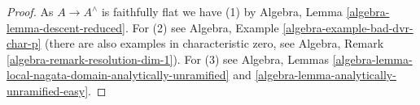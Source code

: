\documentclass[10pt,a4paper]{amsart}
\theoremstyle{plain}
\theoremstyle{definition}
\theoremstyle{remark}
\numberwithin{equation}{subsection}
\begin{document}
\begin{proof}
As $A \to A^\wedge$ is faithfully flat we have (1) by
Algebra, Lemma \ref{algebra-lemma-descent-reduced}.
For (2) see Algebra, Example \ref{algebra-example-bad-dvr-char-p}
(there are also examples in characteristic zero, see
Algebra, Remark \ref{algebra-remark-resolution-dim-1}).
For (3) see Algebra, Lemmas
\ref{algebra-lemma-local-nagata-domain-analytically-unramified} and
\ref{algebra-lemma-analytically-unramified-easy}.
\end{proof}
\end{document}

